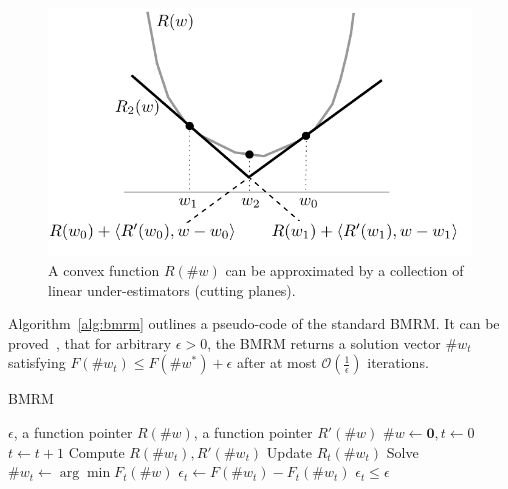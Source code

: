 \begin{figure}[ht]
	\centering
	\includegraphics[width=0.7\linewidth]{fig/bmrm/cpmodel1}
	\caption{A convex function $R(\#w)$ can be approximated by a collection of linear under-estimators (cutting planes).}
	\label{fig:cutting_planes}
\end{figure}

Algorithm~\ref{alg:bmrm} outlines a pseudo-code of the standard BMRM.  It can be proved~\cite{Teo-BMRM-JMLR10}, that for arbitrary $\epsilon>0$, the BMRM returns a solution vector $\#w_t$ satisfying $F(\#w_t)  \leq F(\#w^*) + \epsilon$ after at most $\mathcal{O}(\frac{1}{\epsilon})$ iterations.

\begin{algorithm}[tb]
  \centering
  \caption{BMRM} \label{alg:bmrm}
  \begin{algorithmic}[1]
    \REQUIRE $\epsilon$, a function pointer $R(\#{w})$, a function pointer $R'(\#{w})$
     $\#{w} \leftarrow \mathbf{0}, t \leftarrow 0$
    \REPEAT
      \STATE $t \leftarrow t + 1$
      \STATE Compute $R(\#{w}_t), R'(\#{w}_t)$
      \STATE Update $R_t(\#{w}_t)$
      \STATE Solve $\#{w}_t \leftarrow \arg\min F_t(\#{w})$
      \STATE $\epsilon_t \leftarrow F(\#{w}_t) - F_t(\#{w}_t)$
    \UNTIL $\epsilon_t \le \epsilon$
  \end{algorithmic}
\end{algorithm}


